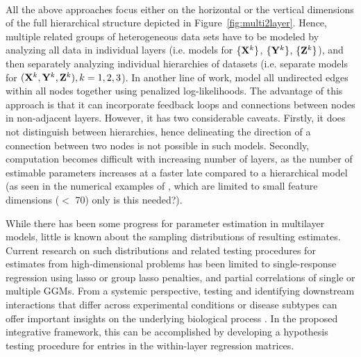 \paragraph{}
All the above approaches focus either on the horizontal or the vertical dimensions of the full hierarchical structure depicted in Figure~\ref{fig:multi2layer}. Hence, multiple related groups of heterogeneous data sets have to be modeled by analyzing all data in individual layers (i.e. models for $\{ {\mathbf{X}}^k \}$, $\{ {\mathbf{Y}}^k \}$, $\{ {\mathbf{Z}}^k \}$), and then separately analyzing individual hierarchies of datasets (i.e. separate models for $({\mathbf{X}}^k, {\mathbf{Y}}^k, {\mathbf{Z}}^k), k = 1,2,3$). In another line of work, \cite{KlingEtal15,ZhangOuyangZhao17} model all undirected edges within all nodes together using penalized log-likelihoods. The advantage of this approach is that it can incorporate feedback loops and connections between nodes in non-adjacent layers. However, it has two considerable caveats. Firstly, it does not distinguish between hierarchies, hence delineating the direction of a connection between two nodes is not possible in such models. Secondly, computation becomes difficult with increasing number of layers, as the number of estimable parameters increases at a faster late compared to a hierarchical model (as seen in the numerical examples of \cite{ZhangOuyangZhao17}, which are limited to small feature dimensions ($<$ 70) only {\colrbf is this needed?}).

While there has been some progress for parameter estimation in multilayer models, little is known about the sampling distributions of resulting estimates. Current research on such distributions and related testing procedures for estimates from high-dimensional problems has been limited to single-response regression using lasso \citep{ZhangZhang14,JavanmardMontanari14,JavanmardMontanari18,vanDeGeerEtal14} or group lasso \citep{MitraZhang16} penalties, and partial correlations of single \citep{CaiLiu16} or multiple \citep{BelilovskyEtal16,Liu17} GGMs. From a systemic perspective, testing and identifying downstream interactions that differ across experimental conditions or disease subtypes can offer important insights on the underlying biological process \citep{MaoEtal17,LiEtal15}. In the proposed integrative framework, this can be accomplished by developing a hypothesis testing procedure for entries in the within-layer regression matrices.

